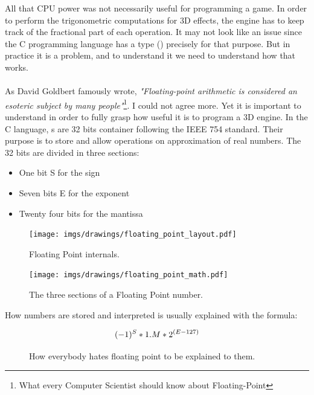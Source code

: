 \documentclass[book.tex]{subfiles}
\begin{document}
   All that CPU power was not necessarily useful for programming a game. In order to perform the trigonometric computations for 3D effects, the engine has to keep track of the fractional part of each operation. It may not look like an issue since the C programming language has a type () precisely for that purpose. But in practice it is a problem, and to understand it we need to understand how that  works.\\
\\
 As David Goldbert famously wrote, \emph{"Floating-point arithmetic is considered an esoteric subject by many people"}\footnote{What every Computer Scientist should know about Floating-Point}. I could not agree more. Yet it is important to understand in order to fully grasp how useful it is to program a 3D engine. In the C language, s are 32 bits container following the IEEE 754 standard. Their purpose is to store and allow operations on approximation of real numbers. The 32 bits are divided in three sections:\\
\begin{itemize}
  \item One bit S for the sign
  \item Seven bits E for the exponent
  \item Twenty four bits for the mantissa
\end{itemize} 

\begin{figure}[H]
\centering
\texttt{[image: imgs/drawings/floating\_point\_layout.pdf]}
\caption{Floating Point internals.}
\end{figure}
  \bigskip



\begin{figure}[H]
\centering
\texttt{[image: imgs/drawings/floating\_point\_math.pdf]}
\caption{The three sections of a Floating Point number.}
\end{figure}
  \bigskip  


How numbers are stored and interpreted is usually explained with the formula:\\
\par
\begin{figure}[H]
\begin{equation}\label{eq:fp}
\large
(-1)^S * 1.M * 2^{(E-127)}
\end{equation}
 \caption{How everybody hates floating point to be explained to them.}
\end{figure}
\bigskip  
\end{document}
